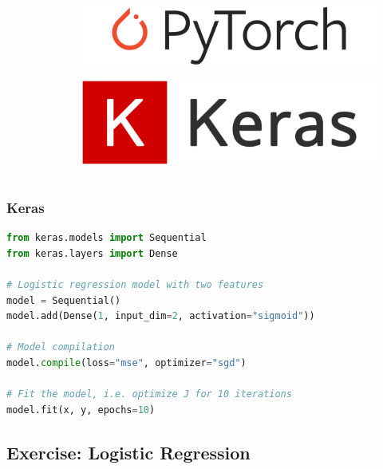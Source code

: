 \documentclass[aspectratio=169]{beamer}
\newcommand\imageright[1]{ %
    \caption*{\scalebox{.5}{\textcolor{lightgray}{\textcopyright~#1}}} %
}
\begin{document}
\begin{frame}
\begin{columns}
\begin{column}{0.23\textwidth}
\begin{figure}
            \imageright{Apache}
        \end{figure}
    \end{column}
    \begin{column}{0.23\textwidth}
        \vspace{2.5cm}
        \begin{figure}
            \centering
            \includegraphics[width=0.9\linewidth]{pytorch.png}
            \imageright{PyTorch}
        \end{figure}
        \begin{figure}
            \centering
            \includegraphics[width=0.9\linewidth]{keras.png}
            \imageright{Keras}
            \vspace{1.2cm}
        \end{figure}
    \end{column}
\end{columns}
\end{frame}

\begin{frame}[fragile]
\frametitle{Keras}

\begin{lstlisting}[language=Python]
from keras.models import Sequential
from keras.layers import Dense

# Logistic regression model with two features
model = Sequential()
model.add(Dense(1, input_dim=2, activation="sigmoid"))

# Model compilation
model.compile(loss="mse", optimizer="sgd")

# Fit the model, i.e. optimize J for 10 iterations
model.fit(x, y, epochs=10)
\end{lstlisting}

\end{frame}

\subsection{Exercise: Logistic Regression}
\label{subsec:exercise-logistic-regression}
\end{document}
